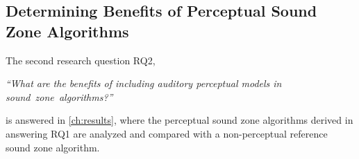 \subsection{Determining Benefits of Perceptual Sound Zone Algorithms}
The second research question RQ2, 

\begin{center}
    {\textit{``What are the benefits of including auditory perceptual models in sound~zone~algorithms?''}}
\end{center}

is answered in \autoref{ch:results}, where the perceptual sound zone algorithms derived in answering RQ1 are 
analyzed and compared with a non-perceptual reference sound zone algorithm.
